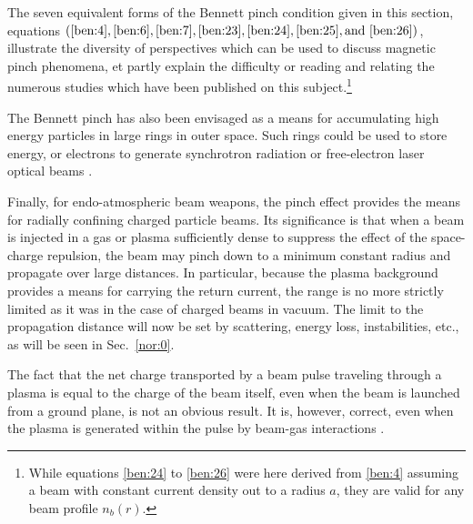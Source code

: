 \documentclass [12pt,a4paper,     ]{report} %
\begin{document}
    The seven equivalent forms of the Bennett pinch condition given in this section, equations $(\ref{ben:4},\ref{ben:6},\ref{ben:7},\ref{ben:23},\ref{ben:24},\ref{ben:25}, \text{and~} \ref{ben:26})$, illustrate the diversity of perspectives which can be used to discuss magnetic pinch phenomena, et partly explain the difficulty or reading and relating the numerous studies which have been published on this subject.\footnote{While equations \eqref{ben:24} to \eqref{ben:26} were here derived from \eqref{ben:4} assuming a beam with constant current density out to a radius $a$, they are valid for any beam profile $n_b(r)$.}

 
    The Bennett pinch has also been envisaged as a means for accumulating high energy particles in large rings in outer space.  Such rings could be used to store energy, or electrons to generate synchrotron radiation or free-electron laser optical beams \cite{SALTE1978-}.

     Finally, for endo-atmospheric beam weapons, the pinch effect provides the means for radially confining charged particle beams.  Its significance  is that when a beam is injected in a gas or plasma sufficiently dense to suppress the effect of the space-charge repulsion, the beam may pinch down to a minimum constant radius and propagate over large distances.  In particular, because the plasma background provides a means for carrying the return current, the range is no more strictly limited as it was in the case of charged beams in vacuum.  The limit to the propagation distance will now be set by scattering, energy loss, instabilities, etc., as will be seen in Sec.~\ref{nor:0}.

	The fact that the net charge transported by a beam pulse traveling through a plasma is equal to the charge of the beam itself, even when the beam is launched from a ground plane, is not an obvious result.  It is, however, correct, even when the plasma is generated within the pulse by beam-gas interactions \cite{LEE--1977A}.
\end{document}
